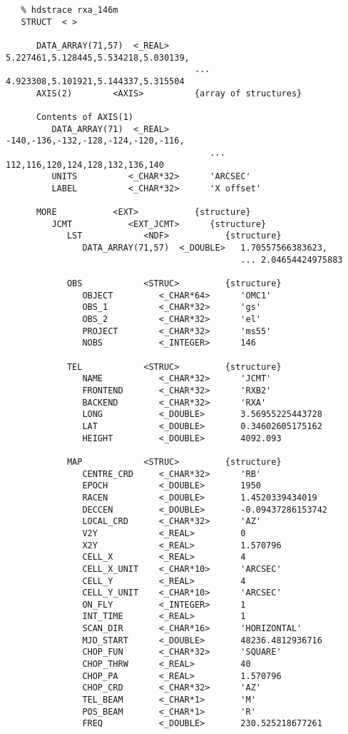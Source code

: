 \begin{verbatim}
   % hdstrace rxa_146m
   STRUCT  < >

      DATA_ARRAY(71,57)  <_REAL>     5.227461,5.128445,5.534218,5.030139,
                                     ... 4.923308,5.101921,5.144337,5.315504
      AXIS(2)        <AXIS>          {array of structures}

      Contents of AXIS(1)
         DATA_ARRAY(71)  <_REAL>        -140,-136,-132,-128,-124,-120,-116,
                                        ... 112,116,120,124,128,132,136,140
         UNITS          <_CHAR*32>      'ARCSEC'
         LABEL          <_CHAR*32>      'X offset'

      MORE           <EXT>           {structure}
         JCMT           <EXT_JCMT>      {structure}
            LST            <NDF>           {structure}
               DATA_ARRAY(71,57)  <_DOUBLE>   1.70557566383623,
                                              ... 2.04654424975883

            OBS            <STRUC>         {structure}
               OBJECT         <_CHAR*64>      'OMC1'
               OBS_1          <_CHAR*32>      'gs'
               OBS_2          <_CHAR*32>      'el'
               PROJECT        <_CHAR*32>      'ms55'
               NOBS           <_INTEGER>      146

            TEL            <STRUC>         {structure}
               NAME           <_CHAR*32>      'JCMT'
               FRONTEND       <_CHAR*32>      'RXB2'
               BACKEND        <_CHAR*32>      'RXA'
               LONG           <_DOUBLE>       3.56955225443728
               LAT            <_DOUBLE>       0.34602605175162
               HEIGHT         <_DOUBLE>       4092.093

            MAP            <STRUC>         {structure}
               CENTRE_CRD     <_CHAR*32>      'RB'
               EPOCH          <_DOUBLE>       1950
               RACEN          <_DOUBLE>       1.4520339434019
               DECCEN         <_DOUBLE>       -0.09437286153742
               LOCAL_CRD      <_CHAR*32>      'AZ'
               V2Y            <_REAL>         0
               X2Y            <_REAL>         1.570796
               CELL_X         <_REAL>         4
               CELL_X_UNIT    <_CHAR*10>      'ARCSEC'
               CELL_Y         <_REAL>         4
               CELL_Y_UNIT    <_CHAR*10>      'ARCSEC'
               ON_FLY         <_INTEGER>      1
               INT_TIME       <_REAL>         1
               SCAN_DIR       <_CHAR*16>      'HORIZONTAL'
               MJD_START      <_DOUBLE>       48236.4812936716
               CHOP_FUN       <_CHAR*32>      'SQUARE'
               CHOP_THRW      <_REAL>         40
               CHOP_PA        <_REAL>         1.570796
               CHOP_CRD       <_CHAR*32>      'AZ'
               TEL_BEAM       <_CHAR*1>       'M'
               POS_BEAM       <_CHAR*1>       'R'
               FREQ           <_DOUBLE>       230.525218677261


\end{verbatim}
